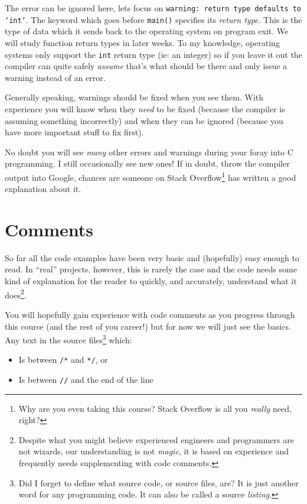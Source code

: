 \documentclass{lab}
\begin{document}
The error can be ignored here, lets focus on \texttt{warning: return type defaults to `int`}. The keyword which goes before \texttt{main()} specifies its \textit{return type}. This is the type of data which it sends back to the operating system on program exit. We will study function return types in later weeks. To my knowledge, operating systems only support the \texttt{int} return type (ie: an integer) so if you leave it out the compiler can quite safely \textit{assume} that's what should be there and only issue a warning instead of an error.

Generally speaking, warnings should be fixed when you see them. With experience you will know when they \textit{need} to be fixed (because the compiler is assuming something incorrectly) and when they can be ignored (because you have more important stuff to fix first).

No doubt you will see \textit{many} other errors and warnings during your foray into C programming. I still occasionally see new ones! If in doubt, throw the compiler output into Google, chances are someone on Stack Overflow\footnote{Why are you even taking this course? Stack Overflow is all you \textit{really} need, right?} has written a good explanation about it.

\pagebreak
\section{Comments}

So far all the code examples have been very basic and (hopefully) easy enough to read. In ``real'' projects, however, this is rarely the case and the code needs some kind of explanation for the reader to quickly, and accurately, understand what it does\footnote{Despite what you might believe experienced engineers and programmers are not wizards, our understanding is not \textit{magic}, it is based on experience and frequently needs supplementing with code comments.}.

You will hopefully gain experience with code comments as you progress through this course (and the rest of you career!) but for now we will just see the basics. Any text in the source files\footnote{Did I forget to define what source code, or source files, are? It is just another word for any programming code. It can also be called a source \textit{listing}.} which:

\begin{itemize}
\item Is between \texttt{/*} and \texttt{*/}, or
\item Is between \texttt{//} and the end of the line
\end{itemize}
\end{document}
